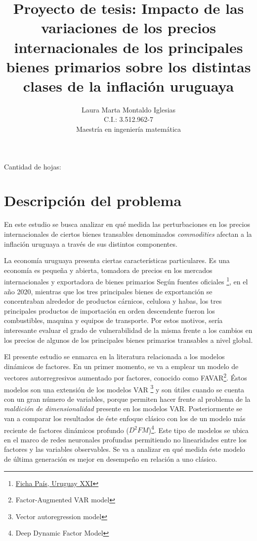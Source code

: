 \documentclass[a4paper,twoside,15pt]{article}
\begin{document}
\setlength{\baselineskip}{16pt}	%



\title{Proyecto de tesis: Impacto de las variaciones de los precios internacionales de los principales bienes primarios sobre los distintas clases de la inflación uruguaya}
\author{Laura Marta Montaldo Iglesias\\ C.I.: 3.512.962-7\\ Maestría en ingeniería matemática}
\maketitle
\vspace{10cm}
\begin{center}
	Cantidad de hojas:
\end{center}

\newpage
\tableofcontents %
\newpage



\section*{Descripción del problema}

En este estudio se busca analizar en qué medida las perturbaciones en los precios internacionales de ciertos bienes transables denominados \textit{commodities} afectan a la inflación uruguaya a través de sus distintos componentes. 

La economía uruguaya presenta ciertas características particulares. Es una economía es pequeña y abierta, tomadora de precios en los mercados internacionales y exportadora de bienes primarios  Según fuentes oficiales \footnote{\href{https://fichapais.uruguayxxi.gub.uy/}{Ficha País, Uruguay XXI}}, en el año 2020, mientras que los tres principales bienes de exportanción se concentraban alrededor de productos cárnicos, celulosa y habas, los tres principales productos de importación en orden descendente fueron los combustibles, maquina y equipos de transporte. Por estos motivos,  sería interesante evaluar el grado de vulnerabilidad de la misma frente a los cambios en los precios de algunos de los principales bienes primarios transables a nivel global.


El presente estudio se enmarca en la literatura relacionada a los modelos dinámicos de factores. En un primer momento, se va a emplear un modelo de vectores autorregresivos aumentado por factores, conocido como FAVAR\footnote{ Factor-Augmented VAR model}. Éstos modelos son una extensión de los modelos VAR \footnote{ Vector autoregression model} 
y son útiles cuando se cuenta con un gran número de variables, porque permiten hacer frente al problema de la \textit{maldición de dimensionalidad} presente en los modelos VAR. Posteriormente se van a comparar los resultados de éste enfoque clásico con los de un modelo más reciente de factores dinámicos profundo ($D^2FM$)\footnote{Deep Dynamic Factor Model}. Este tipo de modelos se ubica en el marco de redes neuronales profundas permitiendo no linearidades entre los factores y las variables observables. Se va a analizar en qué medida éste modelo de última generación es mejor en desempeño en relación a uno clásico.
\end{document}
